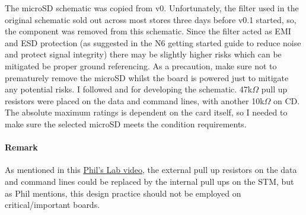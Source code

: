 The microSD schematic was copied from v0. Unfortunately, the filter used in the original schematic sold out across most stores three days before v0.1 started, so, the component was removed from this schematic. Since the filter acted as EMI and ESD protection (as suggested in the N6 getting started guide to reduce noise and protect signal integrity) there may be slightly higher risks which can be mitigated be proper ground referencing. As a precaution, make sure not to prematurely remove the microSD whilst the board is powered just to mitigate any potential risks.
\nl
I followed \cite{usd-design-guidelines} and \cite{st-sdmmc-schematics-thread} for developing the schematic. 47k$\Omega$ pull up resistors were placed on the data and command lines, with another 10k$\Omega$ on CD. The absolute maximum ratings is dependent on the card itself, so I needed to make sure the selected microSD meets the condition requirements.

\paragraph{Remark}
As mentioned in this \href{https://youtu.be/aEwwQMdKd-c?t=246}{Phil's Lab video}, the external pull up resistors on the data and command lines could be replaced by the internal pull ups on the STM, but as Phil mentions, this design practice should not be employed on critical/important boards.